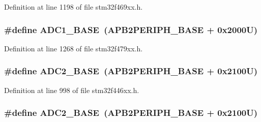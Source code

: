 Definition at line 1198 of file stm32f469xx.\+h.

\subsubsection[{\texorpdfstring{A\+D\+C1\+\_\+\+B\+A\+SE}{ADC1_BASE}}]{\setlength{\rightskip}{0pt plus 5cm}\#define A\+D\+C1\+\_\+\+B\+A\+SE~({\bf A\+P\+B2\+P\+E\+R\+I\+P\+H\+\_\+\+B\+A\+SE} + 0x2000\+U)}\hypertarget{group___peripheral__memory__map_ga695c9a2f892363a1c942405c8d351b91}{}\label{group___peripheral__memory__map_ga695c9a2f892363a1c942405c8d351b91}


Definition at line 1268 of file stm32f479xx.\+h.

\subsubsection[{\texorpdfstring{A\+D\+C2\+\_\+\+B\+A\+SE}{ADC2_BASE}}]{\setlength{\rightskip}{0pt plus 5cm}\#define A\+D\+C2\+\_\+\+B\+A\+SE~({\bf A\+P\+B2\+P\+E\+R\+I\+P\+H\+\_\+\+B\+A\+SE} + 0x2100\+U)}\hypertarget{group___peripheral__memory__map_ga6544abc57f9759f610eee09a02442ae6}{}\label{group___peripheral__memory__map_ga6544abc57f9759f610eee09a02442ae6}


Definition at line 998 of file stm32f446xx.\+h.

\subsubsection[{\texorpdfstring{A\+D\+C2\+\_\+\+B\+A\+SE}{ADC2_BASE}}]{\setlength{\rightskip}{0pt plus 5cm}\#define A\+D\+C2\+\_\+\+B\+A\+SE~({\bf A\+P\+B2\+P\+E\+R\+I\+P\+H\+\_\+\+B\+A\+SE} + 0x2100\+U)}\hypertarget{group___peripheral__memory__map_ga6544abc57f9759f610eee09a02442ae6}{}\label{group___peripheral__memory__map_ga6544abc57f9759f610eee09a02442ae6}


